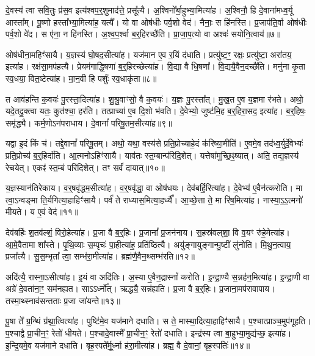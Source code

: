 दे॒वस्य॑ त्वा सवि॒तुः प्र॑स॒व इत्य॑श्वप॒र्॒शुमाद॑त्ते॒ प्रसू᳚त्यै।
अ॒श्विनो᳚र्बा॒हुभ्या॒मित्या॑ह।
अ॒श्विनौ॒ हि दे॒वाना॑मध्व॒र्यू आस्ता᳚म्।
पू॒ष्णो हस्ता᳚भ्या॒मित्या॑ह॒ यत्यै᳚।
यो वा ओष॑धीः पर्व॒शो वेद॑।
नैनाः॒ स हि॑नस्ति।
प्र॒जा\-प॑ति॒र्वा ओष॑धीः पर्व॒शो वे॑द।
स ए॑ना॒ न हि॑नस्ति।
अ॒श्व॒प॒र्श्वा ब॒र्॒हिरच्छै॑ति।
प्रा॒जा॒प॒त्यो वा अश्वः॑ सयोनि॒त्वाय॑॥७॥

ओष॑धीना॒महिꣳ॑सायै।
य॒ज्ञस्य॑ घो॒षद॒सीत्या॑ह।
यज॑मान ए॒व र॒यिं द॑धाति।
प्रत्यु॑ष्ट॒ꣳ॒ रक्षः॒ प्रत्यु॑ष्टा॒ अरा॑तय॒ इत्या॑ह।
रक्ष॑सा॒मप॑हत्यै।
प्रेयम॑गाद्धि॒षणा॑ ब॒र्॒हिरच्छेत्या॑ह।
वि॒द्या वै धि॒षणा᳚।
वि॒द्ययै॒वैन॒दच्छै॑ति।
मनु॑ना कृ॒ता स्व॒धया॒ वित॒ष्टेत्या॑ह।
मा॒न॒वी हि पर्\mbox{}शुः॑ स्व॒धाकृ॑ता॥८॥

त आव॑हन्ति क॒वयः॑ पु॒रस्ता॒दित्या॑ह।
शु॒श्रु॒वाꣳसो॒ वै क॒वयः॑।
य॒ज्ञः पु॒रस्ता᳚त्।
मु॒ख॒त ए॒व य॒ज्ञमा र॑भते।
अथो॒ यदे॒तदु॒क्त्वा यतः॒ कुत॑श्चा॒ हर॑ति।
तत्प्राच्या॑ ए॒व दि॒शो भ॑वति।
दे॒वेभ्यो॒ जुष्ट॑मि॒ह ब॒र्॒हिरा॒सद॒ इत्या॑ह।
ब॒र्॒\mbox{}हिषः॒ समृ॑द्ध्यै।
कर्म॒णो\-ऽन॑पराधाय।
दे॒वानां᳚ परिषू॒तम॒सीत्या॑ह॥९॥

यद्वा इ॒दं किं च॑।
तद्दे॒वानां᳚ परिषू॒तम्।
अथो॒ यथा॒ वस्य॑से प्रति॒प्रोच्याहे॒दं क॑रिष्या॒मीति॑।
ए॒वमे॒व तद॑ध्व॒र्युर्दे॒वेभ्यः॑ प्रति॒प्रोच्य॑ ब॒र्॒हिर्दा॑ति।
आ॒त्मनो\-ऽहिꣳ॑सायै।
याव॑तः स्त॒म्बान्प॑रिदि॒शेत्।
यत्तेषा॑मुच्छि॒ꣴ॒ष्यात्।
अति॒ तद्य॒ज्ञस्य॑ रेचयेत्।
एकꣴ॑ स्त॒म्बं परि॑दिशेत्।
तꣳ सर्वं॑ दायात्॥१०॥

य॒ज्ञस्यान॑तिरेकाय।
व॒र्॒षवृ॑द्धम॒सीत्या॑ह।
व॒र्॒षवृ॑द्धा॒ वा ओष॑धयः।
देव॑बर्\mbox{}हि॒रित्या॑ह।
दे॒वेभ्य॑ ए॒वैन॑त्करोति।
मा त्वा॒\-ऽन्वङ्मा ति॒र्यगित्या॒हाहिꣳ॑सायै।
पर्व॑ ते राध्यास॒मित्या॒हर्ध्यै᳚।
आ॒च्छे॒त्ता ते॒ मा रि॑ष॒मित्या॑ह।
नास्या॒ऽ॒ऽ॒त्मनो॑ मीयते।
य ए॒वं वेद॑॥११॥

देव॑बर्\mbox{}हिः श॒तव॑ल्\mbox{}शं॒ विरो॒हेत्या॑ह।
प्र॒जा वै ब॒र्॒हिः।
प्र॒जानां᳚ प्र॒जन॑नाय।
स॒हस्र॑वल्‌शा॒ वि व॒यꣳ रु॑हे॒मेत्या॑ह।
आ॒\-मे॒वैतामा शा᳚स्ते।
पृ॒थि॒व्याः स॒म्पृचः॑ पा॒हीत्या॑ह॒ प्रति॑\-ष्ठित्यै।
अयु॑ङ्गायुङ्गान्मु॒ष्टीं लु॑नोति।
मि॒थु॒न॒त्वाय॒ प्रजा᳚त्यै।
सु॒स॒म्भृता᳚ त्वा॒ सम्भ॑रा॒मीत्या॑ह।
ब्रह्म॑णै॒वैन॒थ्सम्भ॑रति॥१२॥

अदि॑त्यै॒ रास्ना॒\-ऽसीत्या॑ह।
इ॒यं वा अदि॑तिः।
अ॒स्या ए॒वैन॒द्रास्नां᳚ करोति।
इ॒न्द्रा॒ण्यै स॒न्नह॑न॒मित्या॑ह।
इ॒न्द्रा॒णी वा अग्रे॑ दे॒वता॑ना॒ꣳ॒ सम॑नह्यत।
साऽऽर्ध्नो᳚त्।
ऋद्ध्यै॒ सन्न॑ह्यति।
प्र॒जा वै ब॒र्॒हिः।
प्र॒जाना॒मप॑रावापाय।
तस्मा॒थ्स्नाव॑सन्तताः प्र॒जा जा॑यन्ते॥१३॥

पू॒षा ते᳚ ग्र॒न्थिं ग्र॑थ्ना॒त्वित्या॑ह।
पुष्टि॑मे॒व यज॑माने दधाति।
स ते॒ मास्था॒दित्या॒हाहिꣳ॑सायै।
प॒श्चात्प्राञ्च॒मुप॑गूहति।
प॒श्चाद्वै प्रा॒चीन॒ꣳ॒ रेतो॑ धीयते।
प॒श्चादे॒वास्मै᳚ प्रा॒चीन॒ꣳ॒ रेतो॑ दधाति।
इन्द्र॑स्य त्वा बा॒हुभ्या॒मुद्य॑च्छ॒ इत्या॑ह।
इ॒न्द्रि॒यमे॒व यज॑माने दधाति।
बृह॒स्पते᳚र्मू॒र्ध्ना ह॑रा॒मीत्या॑ह।
ब्रह्म॒ वै दे॒वानां॒ बृह॒स्पतिः॑॥१४॥

